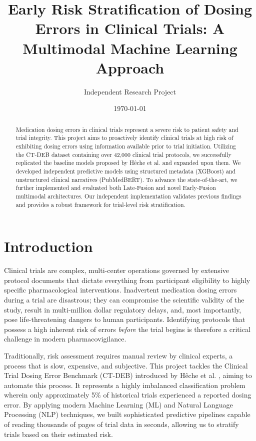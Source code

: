 \documentclass[11pt,a4paper]{article}
\title{\textbf{Early Risk Stratification of Dosing Errors in Clinical Trials: A Multimodal Machine Learning Approach}}
\author{Independent Research Project}
\date{\today}
\begin{document}
\maketitle

\begin{abstract}
Medication dosing errors in clinical trials represent a severe risk to patient safety and trial integrity. This project aims to proactively identify clinical trials at high risk of exhibiting dosing errors using information available prior to trial initiation. Utilizing the CT-DEB dataset containing over 42,000 clinical trial protocols, we successfully replicated the baseline models proposed by Hêche et al. \cite{heche2026} and expanded upon them. We developed independent predictive models using structured metadata (XGBoost) and unstructured clinical narratives (PubMedBERT). To advance the state-of-the-art, we further implemented and evaluated both Late-Fusion and novel Early-Fusion multimodal architectures. Our independent implementation validates previous findings and provides a robust framework for trial-level risk stratification.
\end{abstract}

\section{Introduction}
Clinical trials are complex, multi-center operations governed by extensive protocol documents that dictate everything from participant eligibility to highly specific pharmacological interventions. Inadvertent medication dosing errors during a trial are disastrous; they can compromise the scientific validity of the study, result in multi-million dollar regulatory delays, and, most importantly, pose life-threatening dangers to human participants. Identifying protocols that possess a high inherent risk of errors \textit{before} the trial begins is therefore a critical challenge in modern pharmacovigilance. 

Traditionally, risk assessment requires manual review by clinical experts, a process that is slow, expensive, and subjective. This project tackles the Clinical Trial Dosing Error Benchmark (CT-DEB) introduced by Hêche et al. \cite{heche2026}, aiming to automate this process. It represents a highly imbalanced classification problem wherein only approximately 5\% of historical trials experienced a reported dosing error. By applying modern Machine Learning (ML) and Natural Language Processing (NLP) techniques, we built sophisticated predictive pipelines capable of reading thousands of pages of trial data in seconds, allowing us to stratify trials based on their estimated risk.
\end{document}
